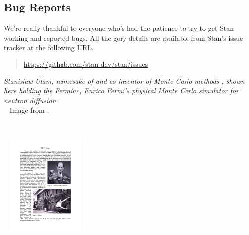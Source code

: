 \subsection*{Bug Reports}

We're really thankful to everyone who's had the patience to try
to get Stan working and reported bugs.  All the gory details are
available from Stan's issue tracker at the following URL.
%
\begin{quote}
\url{https://github.com/stan-dev/stan/issues}
\end{quote}




\vfill
\begin{center}
\hfill
\begin{minipage}[b]{2in}
  \footnotesize {\it Stanislaw Ulam, namesake of \Stan and co-inventor
    of Monte Carlo methods \citep{MetropolisUlam:1949}, shown here
    holding the Fermiac, Enrico Fermi's physical Monte Carlo simulator
    for neutron diffusion.}
  \\[3pt] \mbox{ } \hfill
  {\scriptsize Image from \citep{Giesler:2000}.}
\end{minipage} \ \ \ \ \ 
\begin{minipage}[b]{1.5in} \mbox{ } \hfill
  \includegraphics[width=1.5in]{img/ulam-fermiac.pdf}
\end{minipage} 
\end{center}
